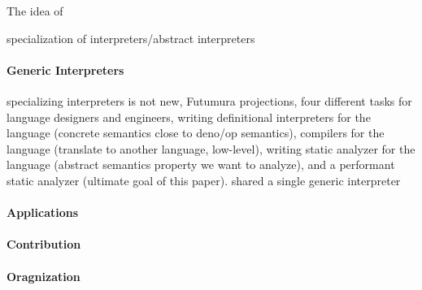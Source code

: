 The idea of 

specialization of interpreters/abstract interpreters

\paragraph{Generic Interpreters}

specializing interpreters is not new, Futumura projections, four different tasks
for language designers and engineers, writing definitional interpreters for the
language (concrete semantics close to deno/op semantics), compilers for the
language (translate to another language, low-level), writing static analyzer for
the language (abstract semantics property we want to analyze), and a performant
static analyzer (ultimate goal of this paper). shared a single generic
interpreter

\paragraph{Applications}

\paragraph{Contribution}

\paragraph{Oragnization}

\iffalse
On the other side, static analysis is a tradeoff between performance and
precision: higher precision usually leads to longer running time.

4. Existing method to improve the performance is adhoc, engineering heavy, require to rewrite the optimized version, therefore harder to reason about the correctness
6. program analyzers are also meta-programs, they manipulate other programs as data objects
\fi
